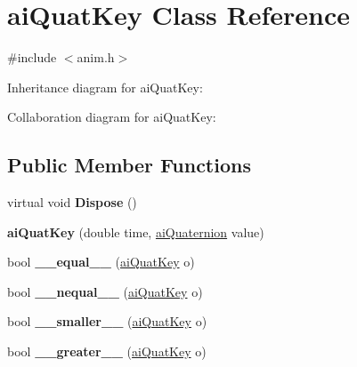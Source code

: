 \hypertarget{structai_quat_key}{\section{ai\+Quat\+Key Class Reference}
\label{structai_quat_key}
}


{\ttfamily \#include $<$anim.\+h$>$}



Inheritance diagram for ai\+Quat\+Key\+:


Collaboration diagram for ai\+Quat\+Key\+:
\subsection*{Public Member Functions}
\begin{DoxyCompactItemize}
\item 
\hypertarget{structai_quat_key_aff9e2cdbbda3b9e1b4ed0d74beaaabdd}{virtual void {\bfseries Dispose} ()}\label{structai_quat_key_aff9e2cdbbda3b9e1b4ed0d74beaaabdd}

\item 
\hypertarget{structai_quat_key_a92ea6b5f3270e9baf3609728f5a680d5}{{\bfseries ai\+Quat\+Key} (double time, \hyperlink{structai_quaternion}{ai\+Quaternion} value)}\label{structai_quat_key_a92ea6b5f3270e9baf3609728f5a680d5}

\item 
\hypertarget{structai_quat_key_abfe36c7c98c6d9835dde39be410d6102}{bool {\bfseries \+\_\+\+\_\+equal\+\_\+\+\_\+} (\hyperlink{structai_quat_key}{ai\+Quat\+Key} o)}\label{structai_quat_key_abfe36c7c98c6d9835dde39be410d6102}

\item 
\hypertarget{structai_quat_key_a89e7d3c7f107a6588dac3305e5742f10}{bool {\bfseries \+\_\+\+\_\+nequal\+\_\+\+\_\+} (\hyperlink{structai_quat_key}{ai\+Quat\+Key} o)}\label{structai_quat_key_a89e7d3c7f107a6588dac3305e5742f10}

\item 
\hypertarget{structai_quat_key_a7ed20f4981841d24807e389f27522952}{bool {\bfseries \+\_\+\+\_\+smaller\+\_\+\+\_\+} (\hyperlink{structai_quat_key}{ai\+Quat\+Key} o)}\label{structai_quat_key_a7ed20f4981841d24807e389f27522952}

\item 
\hypertarget{structai_quat_key_a2940b5b89e0e75cd771fb126dcb09504}{bool {\bfseries \+\_\+\+\_\+greater\+\_\+\+\_\+} (\hyperlink{structai_quat_key}{ai\+Quat\+Key} o)}\label{structai_quat_key_a2940b5b89e0e75cd771fb126dcb09504}

\end{DoxyCompactItemize}
